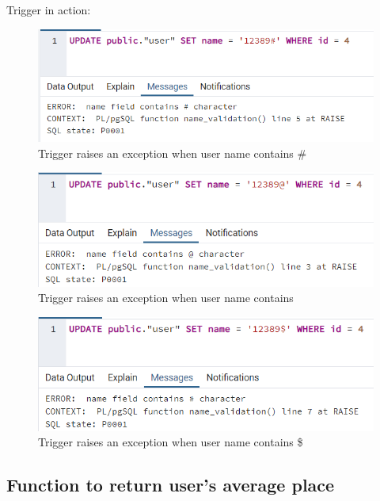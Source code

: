 Trigger in action:
\begin{center}
    \begin{figure}[h]
        \centering
        \includegraphics[]{images/validation_1}
        \caption{Trigger raises an exception when user name contains \#}
        \label{fig:db_validation_1}
    \end{figure}

    \begin{figure}[h]
        \centering
        \includegraphics[]{images/validation_2}
        \caption{Trigger raises an exception when user name contains \@}
        \label{fig:db_validation_3}
    \end{figure}
    \begin{figure}[h]
        \centering
        \includegraphics[]{images/validation_dollar}
        \caption{Trigger raises an exception when user name contains \$}
        \label{fig:db_validation_2}
    \end{figure}
\end{center}

\clearpage

\subsection{Function to return user's average place}\label{subsec:function-to-return-user's-average-place}

